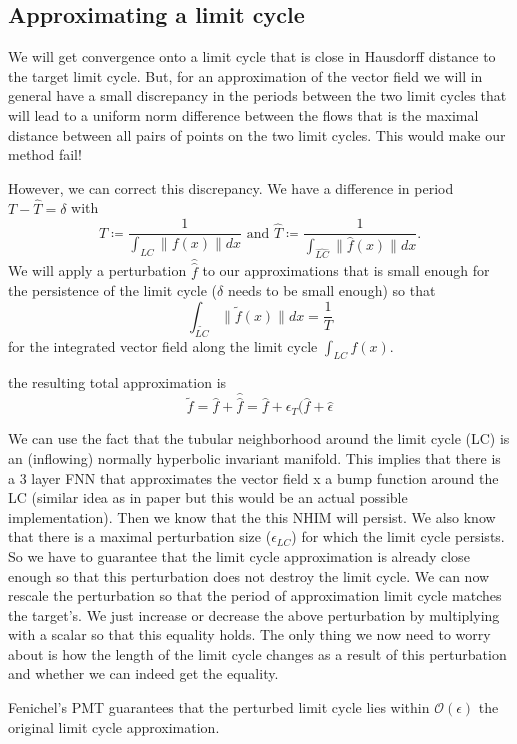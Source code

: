 \documentclass{article}
\theoremstyle{definition}
\theoremstyle{remark}
\begin{document}
\subsection{Approximating a limit cycle}
We will get convergence onto a limit cycle that is close in Hausdorff distance to the target limit cycle. %
But, for an approximation of the vector field we will in general have a small discrepancy in the periods between the two limit cycles that will lead to a uniform norm difference between the flows that is the maximal distance between all pairs of points on the two limit cycles.
This would make our method fail!

However, we can correct this discrepancy.
We have a difference in period $T-\hat T = \delta$
with \[T\coloneqq\frac{1}{\int_{LC}\|f(x)\|dx} \text{ and } \hat T\coloneqq\frac{1}{\int_{\hat{LC}}\|\hat f(x)\|dx}.\]
%
We will apply a perturbation $\hat{\hat{f}}$ to our approximations that is small enough for the persistence of the limit cycle ($\delta$ needs to be small enough) 
so that 
\[\int_{\tilde{LC}}\|\tilde{f}(x)\| dx = \frac{1}{T}	\] for the integrated vector field along the limit cycle $\int_{LC}f(x)$.

the resulting total approximation is \[\tilde{f}=\hat{f}+\hat{\hat{f}} = \hat{f} + \epsilon_T(\hat{f} + \hat{\epsilon}\]


We can use the fact that the tubular neighborhood around the limit cycle (LC) is an (inflowing) normally hyperbolic invariant manifold.
This implies that there is a 3 layer FNN that approximates the vector field x a bump function around the LC (similar idea as in paper but this would be an actual possible implementation).
Then we know that the this NHIM will persist.
We also know that there is a maximal perturbation size ($\epsilon_{LC}$) for which the limit cycle persists.
So we have to guarantee that the limit cycle approximation is already close enough so that this perturbation does not destroy the limit cycle.
We can now rescale the perturbation so that the period of approximation limit cycle matches the target's. 
We just increase or decrease  the above perturbation by multiplying with a scalar so that this equality holds.
The only thing we now need to worry about is how the length of the limit cycle changes as a result of this perturbation and whether we can indeed get the equality.

Fenichel's PMT guarantees that the perturbed limit cycle lies within $\mathcal{O}(\epsilon)$ the original limit cycle approximation.
\end{document}
